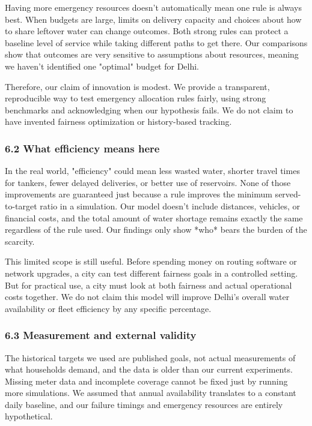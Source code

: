 \documentclass[conference]{IEEEtran}
\begin{document}
Having more emergency resources doesn't automatically mean one rule is always best. When budgets are large, limits on delivery capacity and choices about how to share leftover water can change outcomes. Both strong rules can protect a baseline level of service while taking different paths to get there. Our comparisons show that outcomes are very sensitive to assumptions about resources, meaning we haven't identified one "optimal" budget for Delhi.

Therefore, our claim of innovation is modest. We provide a transparent, reproducible way to test emergency allocation rules fairly, using strong benchmarks and acknowledging when our hypothesis fails. We do not claim to have invented fairness optimization or history-based tracking.

\subsubsection{6.2 What efficiency means here}
In the real world, "efficiency" could mean less wasted water, shorter travel times for tankers, fewer delayed deliveries, or better use of reservoirs. None of those improvements are guaranteed just because a rule improves the minimum served-to-target ratio in a simulation. Our model doesn't include distances, vehicles, or financial costs, and the total amount of water shortage remains exactly the same regardless of the rule used. Our findings only show *who* bears the burden of the scarcity.

This limited scope is still useful. Before spending money on routing software or network upgrades, a city can test different fairness goals in a controlled setting. But for practical use, a city must look at both fairness and actual operational costs together. We do not claim this model will improve Delhi's overall water availability or fleet efficiency by any specific percentage.

\subsubsection{6.3 Measurement and external validity}
The historical targets we used are published goals, not actual measurements of what households demand, and the data is older than our current experiments. Missing meter data and incomplete coverage cannot be fixed just by running more simulations. We assumed that annual availability translates to a constant daily baseline, and our failure timings and emergency resources are entirely hypothetical.
\end{document}
